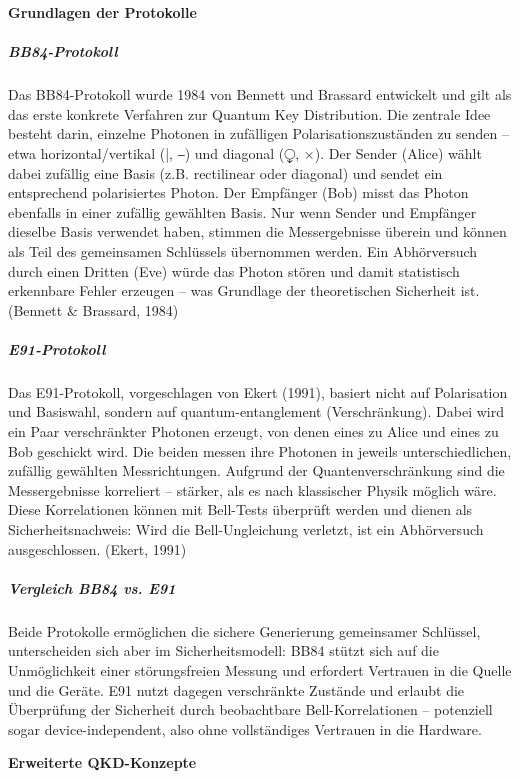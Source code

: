 \vspace{1em}
\noindent\textbf{Grundlagen der Protokolle}

\subparagraph{BB84-Protokoll}
Das BB84-Protokoll wurde 1984 von Bennett und Brassard entwickelt und gilt als das erste konkrete Verfahren zur Quantum Key Distribution. Die zentrale Idee besteht darin, einzelne Photonen in zufälligen Polarisationszuständen zu senden – etwa horizontal/vertikal (|, ⎯) und diagonal (⧬, ×).
Der Sender (Alice) wählt dabei zufällig eine Basis (z.B. rectilinear oder diagonal) und sendet ein entsprechend polarisiertes Photon. Der Empfänger (Bob) misst das Photon ebenfalls in einer zufällig gewählten Basis. Nur wenn Sender und Empfänger dieselbe Basis verwendet haben, stimmen die Messergebnisse überein und können als Teil des gemeinsamen Schlüssels übernommen werden.
Ein Abhörversuch durch einen Dritten (Eve) würde das Photon stören und damit statistisch erkennbare Fehler erzeugen – was Grundlage der theoretischen Sicherheit ist.
 (Bennett & Brassard, 1984)
 
\subparagraph{E91-Protokoll}
Das E91-Protokoll, vorgeschlagen von Ekert (1991), basiert nicht auf Polarisation und Basiswahl, sondern auf quantum-entanglement (Verschränkung). Dabei wird ein Paar verschränkter Photonen erzeugt, von denen eines zu Alice und eines zu Bob geschickt wird.
Die beiden messen ihre Photonen in jeweils unterschiedlichen, zufällig gewählten Messrichtungen. Aufgrund der Quantenverschränkung sind die Messergebnisse korreliert – stärker, als es nach klassischer Physik möglich wäre. Diese Korrelationen können mit Bell-Tests überprüft werden und dienen als Sicherheitsnachweis: Wird die Bell-Ungleichung verletzt, ist ein Abhörversuch ausgeschlossen.
(Ekert, 1991)

\subparagraph{Vergleich BB84 vs. E91}
Beide Protokolle ermöglichen die sichere Generierung gemeinsamer Schlüssel, unterscheiden sich aber im Sicherheitsmodell:
BB84 stützt sich auf die Unmöglichkeit einer störungsfreien Messung und erfordert Vertrauen in die Quelle und die Geräte.
E91 nutzt dagegen verschränkte Zustände und erlaubt die Überprüfung der Sicherheit durch beobachtbare Bell-Korrelationen – potenziell sogar device-independent, also ohne vollständiges Vertrauen in die Hardware.

\vspace{1em}
\noindent\textbf{Erweiterte QKD-Konzepte}

